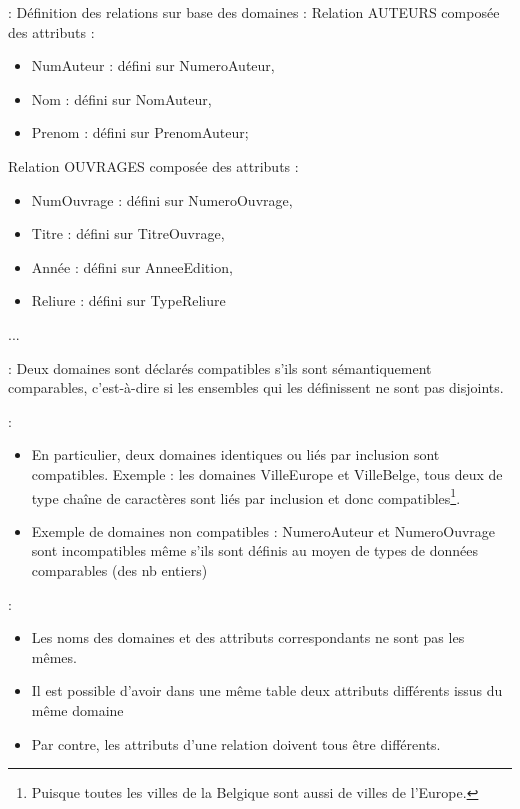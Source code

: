 \documentclass[10pt]{beamer}
\begin{document}
\begin{frame}{\secname : \subsecname}
    Définition des  relations sur base des domaines :
    Relation AUTEURS composée des attributs :
    \begin{itemize}
        \item NumAuteur : défini sur NumeroAuteur,
        \item Nom : défini sur NomAuteur,
        \item Prenom : défini sur PrenomAuteur;
    \end{itemize}
    Relation OUVRAGES composée des attributs :
    \begin{itemize}
        \item NumOuvrage : défini sur NumeroOuvrage,
        \item Titre : défini sur TitreOuvrage,
        \item Année : défini sur AnneeEdition,
        \item Reliure : défini sur TypeReliure
    \end{itemize}
    ...
\end{frame}

\begin{frame}{\secname : \subsecname}
    Deux domaines sont déclarés compatibles s’ils sont sémantiquement comparables, c’est-à-dire si les ensembles qui les définissent ne sont pas disjoints.
\end{frame}

\begin{frame}{\secname : \subsecname}
    \begin{itemize}
        \item En particulier, deux domaines identiques ou liés par inclusion sont compatibles.
              Exemple : les domaines VilleEurope et VilleBelge, tous deux de type chaîne de caractères sont liés par inclusion et donc compatibles\footnote{Puisque toutes les villes de la Belgique sont aussi de villes de l'Europe.}.
        \item Exemple de domaines non compatibles : NumeroAuteur et NumeroOuvrage sont incompatibles même s’ils sont définis au moyen de types de données comparables (des nb entiers)
    \end{itemize}
\end{frame}

\begin{frame}{\secname : \subsecname}
    \begin{itemize}
        \item Les noms des domaines et des attributs correspondants ne sont pas les mêmes.
        \item Il est possible d’avoir dans une même table deux attributs différents issus du même domaine
        \item Par contre, les attributs d’une relation doivent tous être différents.
    \end{itemize}
\end{frame}
\end{document}
